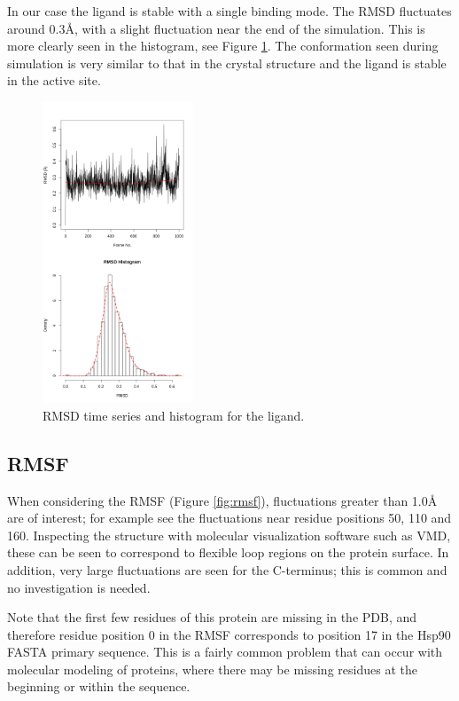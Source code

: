 \documentclass[twocolumn]{bmcart}%
\begin{document}
In our case the ligand is stable with a single binding mode. The RMSD fluctuates around 0.3{\AA}, with a slight fluctuation near the end of the simulation. This is more clearly seen in the histogram, see Figure \ref{fig:rmsdligand}. The conformation seen during simulation is very similar to that in the crystal structure and the ligand is stable in the active site.

\begin{figure}[ht!]
  \includegraphics[width=0.4\textwidth]{htmd_analysis_rmsd2_merge}
  \caption{
      RMSD time series and histogram for the ligand.}
  \label{fig:rmsdligand}
\end{figure}


\subsection*{RMSF}
When considering the RMSF (Figure \ref{fig:rmsf}), fluctuations greater than 1.0{\AA} are of interest; for example see the fluctuations near residue positions 50, 110 and 160.  Inspecting the structure with molecular visualization software such as VMD, these can be seen to correspond to flexible loop regions on the protein surface. In addition, very large fluctuations are seen for the C-terminus; this is common and no investigation is needed.

Note that the first few residues of this protein are missing in the PDB, and therefore residue position 0 in the RMSF corresponds to position 17 in the Hsp90 FASTA primary sequence. This is a fairly common problem that can occur with molecular modeling of proteins, where there may be missing residues at the beginning or within the sequence.
\end{document}
